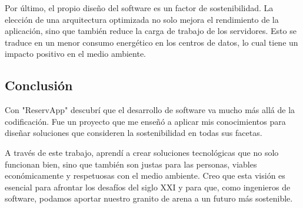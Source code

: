 Por último, el propio diseño del software es un factor de sostenibilidad. La elección de una arquitectura optimizada no solo mejora el rendimiento de la aplicación, sino que también reduce la carga de trabajo de los servidores. Esto se traduce en un menor consumo energético en los centros de datos, lo cual tiene un impacto positivo en el medio ambiente.

\subsection{Conclusión}
Con "ReservApp" descubrí que el desarrollo de software va mucho más allá de la codificación. Fue un proyecto que me enseñó a aplicar mis conocimientos para diseñar soluciones que consideren la sostenibilidad en todas sus facetas.

A través de este trabajo, aprendí a crear soluciones tecnológicas que no solo funcionan bien, sino que también son justas para las personas, viables económicamente y respetuosas con el medio ambiente. Creo que esta visión es esencial para afrontar los desafíos del siglo XXI y para que, como ingenieros de software, podamos aportar nuestro granito de arena a un futuro más sostenible.